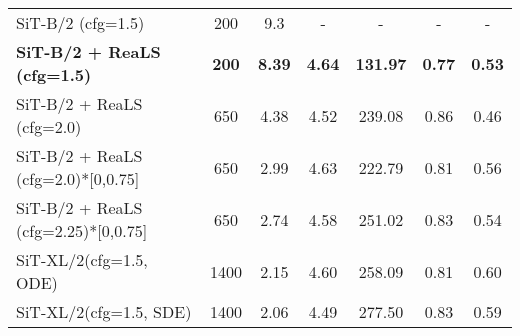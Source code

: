 \begin{table}[t]
{\begin{tabular}{lcccccc}
SiT-B/2 (cfg=1.5)~\cite{sit}          & 200      & 9.3           & -                & -            & -                   & -                \\
\rowcolor{blue!15} \textbf{SiT-B/2 + ReaLS (cfg=1.5)}   & \textbf{200}    & \textbf{8.39}            & \textbf{4.64}             & \textbf{131.97}       & \textbf{0.77}                & \textbf{0.53}             \\
\rowcolor{blue!15} SiT-B/2 + ReaLS (cfg=2.0)  & 650    & 4.38            & 4.52             & 239.08       & 0.86                & 0.46             \\ 
\rowcolor{blue!15} SiT-B/2 + ReaLS (cfg=2.0)*[0,0.75]  & 650    & 2.99            & 4.63             & 222.79       & 0.81                & 0.56             \\ 
\rowcolor{blue!15} SiT-B/2 + ReaLS (cfg=2.25)*[0,0.75]  & 650    & 2.74            & 4.58             & 251.02       & 0.83                & 0.54             \\ 
SiT-XL/2(cfg=1.5, ODE)     & 1400   & 2.15            & 4.60             & 258.09       & 0.81                & 0.60             \\
SiT-XL/2(cfg=1.5, SDE)     & 1400       & 2.06            & 4.49             & 277.50       & 0.83                & 0.59             \\ 

\end{tabular}}
\end{table}
